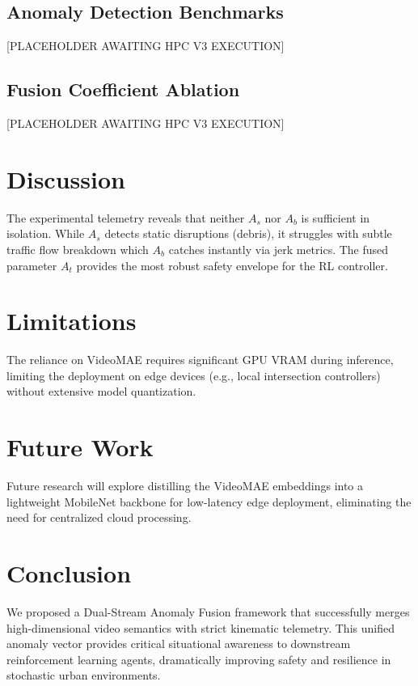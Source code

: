\documentclass{ieeeaccess}
\begin{document}
\subsection{Anomaly Detection Benchmarks}
[PLACEHOLDER AWAITING HPC V3 EXECUTION]

\subsection{Fusion Coefficient Ablation}
[PLACEHOLDER AWAITING HPC V3 EXECUTION]

\section{Discussion}
\label{sec:discussion}
The experimental telemetry reveals that neither $A_s$ nor $A_b$ is sufficient in isolation. While $A_s$ detects static disruptions (debris), it struggles with subtle traffic flow breakdown which $A_b$ catches instantly via jerk metrics. The fused parameter $A_t$ provides the most robust safety envelope for the RL controller.

\section{Limitations}
\label{sec:limitations}
The reliance on VideoMAE requires significant GPU VRAM during inference, limiting the deployment on edge devices (e.g., local intersection controllers) without extensive model quantization.

\section{Future Work}
\label{sec:future_work}
Future research will explore distilling the VideoMAE embeddings into a lightweight MobileNet backbone for low-latency edge deployment, eliminating the need for centralized cloud processing.

\section{Conclusion}
\label{sec:conclusion}
We proposed a Dual-Stream Anomaly Fusion framework that successfully merges high-dimensional video semantics with strict kinematic telemetry. This unified anomaly vector provides critical situational awareness to downstream reinforcement learning agents, dramatically improving safety and resilience in stochastic urban environments.



\end{document}
